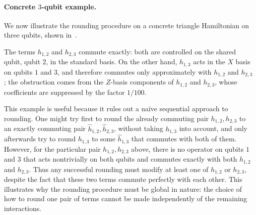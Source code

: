 \documentclass[a4paper,onecolumn,11pt]{quantumarticle}
\theoremstyle{plain}
\begin{document}
\paragraph{Concrete $3$-qubit example.}

We now illustrate the rounding procedure on a concrete triangle Hamiltonian
on three qubits, shown in~. 

The terms $h_{1,2}$ and $h_{2,3}$ commute exactly: both are controlled on
the shared qubit, qubit $2$, in the standard basis.  On the other hand,
$h_{1,3}$ acts in the $X$ basis on qubits $1$ and $3$, and therefore
commutes only approximately with $h_{1,2}$ and $h_{2,3}$; the obstruction
comes from the $Z$-basis components of $h_{1,2}$ and $h_{2,3}$, whose
coefficients are suppressed by the factor $1/100$.

This example is useful because it rules out a na\"{i}ve sequential
approach to rounding.  One might try first to round the already commuting
pair $h_{1,2},h_{2,3}$ to an exactly commuting pair
$\hat h_{1,2},\hat h_{2,3}$, without taking $h_{1,3}$ into account, and only
afterwards try to round $h_{1,3}$ to some $\hat h_{1,3}$ that commutes with
both of them.  However, for the particular pair $h_{1,2},h_{2,3}$ above,
there is no operator on qubits $1$ and $3$ that acts nontrivially on both
qubits and commutes exactly with both $h_{1,2}$ and $h_{2,3}$.  Thus any
successful rounding must modify at least one of $h_{1,2}$ or $h_{2,3}$,
despite the fact that these two terms commute perfectly with each other.
This illustrates why the rounding procedure must be global in nature: the
choice of how to round one pair of terms cannot be made independently of
the remaining interactions.


\end{document}
